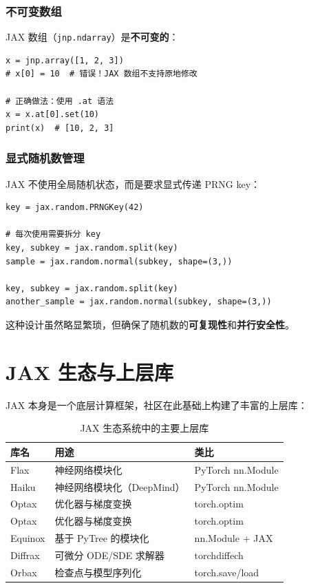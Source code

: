 \documentclass[12pt,a4paper]{article}
\begin{document}
\subsubsection{不可变数组}

JAX 数组（\texttt{jnp.ndarray}）是\textbf{不可变的}：

\begin{lstlisting}
x = jnp.array([1, 2, 3])
# x[0] = 10  # 错误！JAX 数组不支持原地修改

# 正确做法：使用 .at 语法
x = x.at[0].set(10)
print(x)  # [10, 2, 3]
\end{lstlisting}

\subsubsection{显式随机数管理}

JAX 不使用全局随机状态，而是要求显式传递 PRNG key：

\begin{lstlisting}
key = jax.random.PRNGKey(42)

# 每次使用需要拆分 key
key, subkey = jax.random.split(key)
sample = jax.random.normal(subkey, shape=(3,))

key, subkey = jax.random.split(key)
another_sample = jax.random.normal(subkey, shape=(3,))
\end{lstlisting}

这种设计虽然略显繁琐，但确保了随机数的\textbf{可复现性}和\textbf{并行安全性}。

\section{JAX 生态与上层库}

JAX 本身是一个底层计算框架，社区在此基础上构建了丰富的上层库：

\begin{table}[htbp]
\centering
\caption{JAX 生态系统中的主要上层库}
\label{tab:ecosystem}
\begin{tabular}{@{}lll@{}}
\toprule
\textbf{库名} & \textbf{用途} & \textbf{类比} \\
\midrule
Flax        & 神经网络模块化       & PyTorch nn.Module \\
Haiku       & 神经网络模块化（DeepMind） & PyTorch nn.Module \\
Optax       & 优化器与梯度变换     & torch.optim       \\
Optax       & 优化器与梯度变换     & torch.optim       \\
Equinox     & 基于 PyTree 的模块化 & nn.Module + JAX   \\
Diffrax     & 可微分 ODE/SDE 求解器 & torchdiffech      \\
Orbax       & 检查点与模型序列化   & torch.save/load   \\
\bottomrule
\end{tabular}
\end{table}
\end{document}
